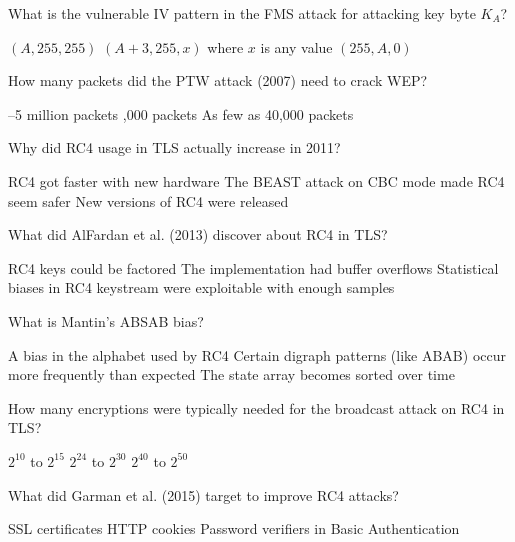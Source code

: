 \documentclass[10pt,a4paper,american]{exam}
\begin{document}
\begin{questions}
	\question What is the vulnerable IV pattern in the FMS attack for attacking key byte $K_A$?
	\begin{randomizechoices}
		\choice $(A, 255, 255)$
		\CorrectChoice $(A+3, 255, x)$ where $x$ is any value
		\choice $(255, A, 0)$
	\end{randomizechoices}

	\question How many packets did the PTW attack (2007) need to crack WEP?
	\begin{randomizechoices}
		--5 million packets
		,000 packets
		\CorrectChoice As few as 40,000 packets
	\end{randomizechoices}

	\question Why did RC4 usage in TLS actually increase in 2011?
	\begin{randomizechoices}
		\choice RC4 got faster with new hardware
		\CorrectChoice The BEAST attack on CBC mode made RC4 seem safer
		\choice New versions of RC4 were released
	\end{randomizechoices}

	\question What did AlFardan et al. (2013) discover about RC4 in TLS?
	\begin{randomizechoices}
		\choice RC4 keys could be factored
		\choice The implementation had buffer overflows
		\CorrectChoice Statistical biases in RC4 keystream were exploitable with enough samples
	\end{randomizechoices}

	\question What is Mantin's ABSAB bias?
	\begin{randomizechoices}
		\choice A bias in the alphabet used by RC4
		\CorrectChoice Certain digraph patterns (like ABAB) occur more frequently than expected
		\choice The state array becomes sorted over time
	\end{randomizechoices}

	\question How many encryptions were typically needed for the broadcast attack on RC4 in TLS?
	\begin{randomizechoices}
		\choice $2^{10}$ to $2^{15}$
		\CorrectChoice $2^{24}$ to $2^{30}$
		\choice $2^{40}$ to $2^{50}$
	\end{randomizechoices}

	\question What did Garman et al. (2015) target to improve RC4 attacks?
	\begin{randomizechoices}
		\choice SSL certificates
		\choice HTTP cookies
		\CorrectChoice Password verifiers in Basic Authentication
	\end{randomizechoices}


\end{questions}
\end{document}
